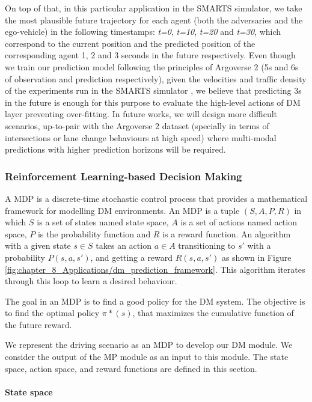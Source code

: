 On top of that, in this particular application in the \ac{SMARTS} simulator, we take the most plausible future trajectory for each agent (both the adversaries and the ego-vehicle) in the following timestamps: \textit{t=0}, \textit{t=10}, \textit{t=20} and \textit{t=30}, which correspond to the current position and the predicted position of the corresponding agent 1, 2 and 3 seconds in the future respectively. Even though we train our prediction model following the principles of Argoverse 2 (5s and 6s of observation and prediction respectively), given the velocities and traffic density of the experiments run in the \ac{SMARTS} simulator , we believe that predicting 3s in the future is enough for this purpose to evaluate the high-level actions of \ac{DM} layer preventing over-fitting. In future works, we will design more difficult scenarios, up-to-pair with the Argoverse 2 dataset (specially in terms of intersections or lane change behaviours at high speed) where multi-modal predictions with higher prediction horizons will be required.

\subsubsection{Reinforcement Learning-based Decision Making}
\label{subsubsec:8_decision_making_our_approach_dm}

A \ac{MDP} is a discrete-time stochastic control process that provides a mathematical framework for modelling \ac{DM} environments. An \ac{MDP} is a tuple $(S,A,P,R)$ in which $S$ is a set of states named state space, $A$ is a set of actions named action space, $P$ is the probability function and $R$ is a reward function. An algorithm with a given state $s \in S$ takes an action $a \in A$ transitioning to $s'$ with a probability $P(s,a,s')$, and getting a reward $R(s,a,s')$ as shown in Figure \ref{fig:chapter_8_Applications/dm_prediction_framework}. This algorithm iterates through this loop to learn a desired behaviour. 

The goal in an \ac{MDP} is to find a good policy for the \ac{DM} system. The objective is to find the optimal policy $\pi*(s)$, that maximizes the cumulative function of the future reward.

We represent the driving scenario as an \ac{MDP} to develop our \ac{DM} module. We consider the output of the \ac{MP} module as an input to this module. The state space, action space, and reward functions are defined in this section.

\paragraph{State space}
\label{par:8_decision_making_our_approach_dm_state_space}


